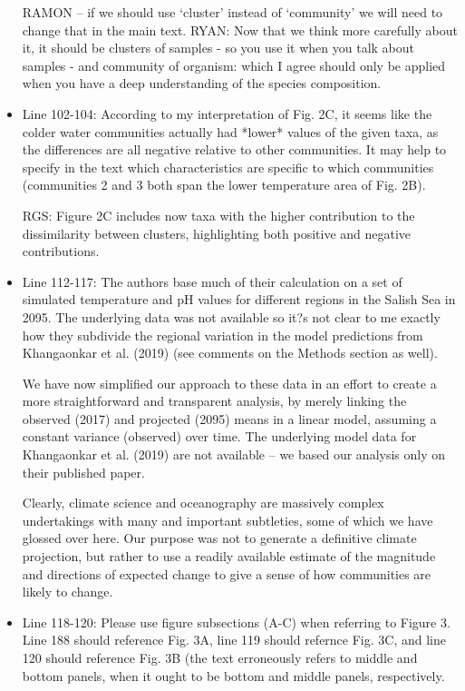 \documentclass[11pt]{article}
\begin{document}
\begin{linenumbers}
\begin{itemize}
{\color{red} RAMON -- if we should use `cluster' instead of `community' we will need to change that in the main text. RYAN: Now that we think more carefully about it, it should be clusters of samples - so you use it when you talk about samples - and community of organism: which I agree should only be applied when you have  a deep understanding of the species composition.}


\item{Line 102-104: According to my interpretation of Fig. 2C, it seems like the colder water communities actually had *lower* values of the given taxa, as the differences are all negative relative to other communities. It may help to specify in the text which characteristics are specific to which communities (communities 2 and 3 both span the lower temperature area of Fig. 2B).}

{\color{red} RGS: Figure 2C includes now taxa with the higher contribution to the dissimilarity between clusters, highlighting both positive and negative contributions.  }


\item{Line 112-117: The authors base much of their calculation on a set of simulated temperature and pH values for different regions in the Salish Sea in 2095. The underlying data was not available so it?s not clear to me exactly how they subdivide the regional variation in the model predictions from Khangaonkar et al. (2019) (see comments on the Methods section as well).}

We have now simplified our approach to these data in an effort to create a more straightforward and transparent analysis, by merely linking the observed (2017) and projected (2095) means in a linear model, assuming a constant variance (observed) over time. The underlying model data for Khangaonkar et al. (2019) are not available -- we based our analysis only on their published paper. 

Clearly, climate science and oceanography are massively complex undertakings with many and important subtleties, some of which we have glossed over here. Our purpose was not to generate a definitive climate projection, but rather to use a readily available estimate of the magnitude and directions of expected change to give a sense of how communities are likely to change. 

\item{Line 118-120: Please use figure subsections (A-C) when referring to Figure 3. Line 188 should reference Fig. 3A, line 119 should refernce Fig. 3C, and line 120 should reference Fig. 3B (the text erroneously refers to middle and bottom panels, when it ought to be bottom and middle panels, respectively.}


\end{itemize}
\end{linenumbers}
\end{document}

